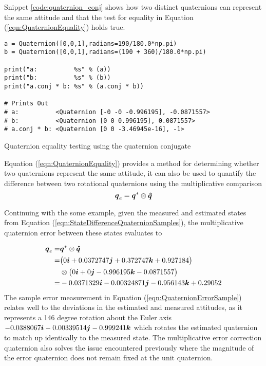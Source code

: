 Snippet \ref{code:quaternion_conj} shows how two distinct quaternions can represent the same attitude and that the test for equality in Equation (\ref{eqn:QuaternionEquality}) holds true.

\begin{listing}
\begin{singlespace}
  \begin{verbatim}
a = Quaternion([0,0,1],radians=190/180.0*np.pi)
b = Quaternion([0,0,1],radians=(190 + 360)/180.0*np.pi)

print("a:          %s" % (a))
print("b:          %s" % (b))
print("a.conj * b: %s" % (a.conj * b))

# Prints Out
# a:          <Quaternion [-0 -0 -0.996195], -0.0871557>
# b:          <Quaternion [0 0 0.996195], 0.0871557>
# a.conj * b: <Quaternion [0 0 -3.46945e-16], -1>
  \end{verbatim}
\caption{Quaternion equality testing using the quaternion conjugate}
\label{code:quaternion_conj}
\nocite{minted}
\end{singlespace}
\end{listing}

Equation (\ref{eqn:QuaternionEquality}) provides a method for determining whether two quaternions represent the same attitude, it can also be used to quantify the difference between two rotational quaternions using the multiplicative comparison
\begin{equation}
  \boldsymbol{q}_e = \boldsymbol{q}^* \otimes \boldsymbol{\hat{q}}
  \label{eqn:QuaternionError}
\end{equation}

Continuing with the some example, given the measured and estimated states from Equation (\ref{eqn:StateDifferenceQuaternionSamples}), the multiplicative quaternion error between these states evaluates to

\begin{equation}
  \begin{aligned}
    \boldsymbol{q}_e = & \boldsymbol{q}^* \otimes \boldsymbol{\hat{q}} \\
    = & \big( 0 \boldsymbol{i} +0.0372747 \boldsymbol{j} +0.372747 \boldsymbol{k} +0.927184 \big) \\
    & \otimes \big( 0 \boldsymbol{i} +0 \boldsymbol{j} -0.996195 \boldsymbol{k} -0.0871557 \big)\\
    = & -0.0371329 \boldsymbol{i} -0.00324871 \boldsymbol{j} -0.956143 \boldsymbol{k} +0.29052
  \end{aligned}
  \label{eqn:QuaternionErrorSample}
\end{equation}
The sample error measurement in Equation (\ref{eqn:QuaternionErrorSample}) relates well to the deviations in the estimated and measured attitudes, as it represents a 146 degree rotation about the Euler axis $-0.0388067 \boldsymbol{i} -0.00339514 \boldsymbol{j} -0.999241\boldsymbol{k}$ which rotates the estimated quaternion to match up identically to the measured state.  The multiplicative error correction quaternion also solves the issue encountered previously where the magnitude of the error quaternion does not remain fixed at the unit quaternion.

